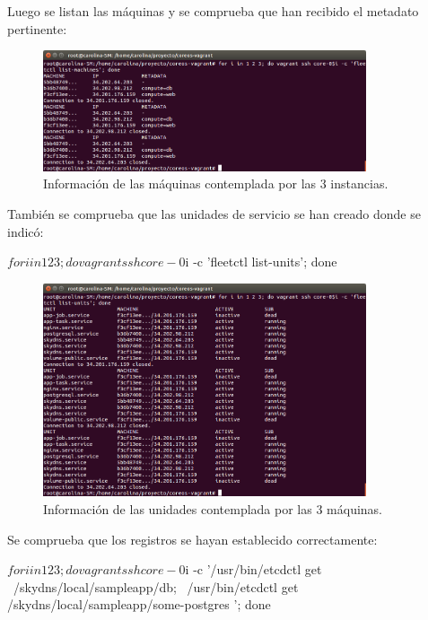 Luego se listan las máquinas y se comprueba que han recibido el metadato pertinente:


\begin{figure}[H]
\centering
\includegraphics[width=0.85\textwidth]{images/figures/skydns-machines.png}
\caption{Información de las máquinas contemplada por las 3 instancias.}
\end{figure}

También se comprueba que las unidades de servicio se han creado donde se indicó:
\begin{code}
$ for i in 1 2 3; do vagrant ssh core-0$i -c 'fleetctl list-units'; done
\end{code}

\begin{figure}[H]
\centering
\includegraphics[width=0.85\textwidth]{images/figures/skydns-units.png}
\caption{Información de las unidades contemplada por las 3 máquinas.}
\end{figure}

Se comprueba que los registros se hayan establecido correctamente:

\begin{code}
$ for i in 1 2 3; do vagrant ssh core-0$i -c '/usr/bin/etcdctl get \
  /skydns/local/sampleapp/db; \
  /usr/bin/etcdctl get /skydns/local/sampleapp/some-postgres '; done
\end{code}

